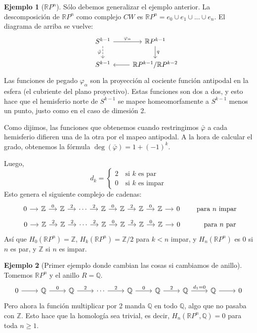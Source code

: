 \documentclass[spanish]{book}
\theoremstyle{definition}
\newtheorem*{ejem}{Ejemplo}
\newcommand{\R}{\mathbb{R}}
\newcommand{\Z}{\mathbb{Z}}
\newcommand{\Q}{\mathbb{Q}}
\begin{document}
	\begin{ejem}[$\R P^n$]
		Sólo debemos generalizar el ejemplo anterior. La descomposición de $\R P^n$ como complejo $CW$ es $\R P^n=e_0\cup e_1\cup...\cup e_n$. El diagrama de arriba se vuelve:
		\[\begin{tikzcd}
			& S^{k-1} \arrow[r, "\varphi_\alpha"] \arrow[d, dashed,swap, "\bar\varphi"] & \mathbb{R}P^{k-1} \arrow[d, "q"] \\
			& S^{k-1} & \mathbb{R}P^{k-1}/\mathbb{R}P^{k-2} \arrow[l]
		\end{tikzcd}\]
		Las funciones de pegado $\varphi_\alpha$ son la proyección al cociente función antipodal en la esfera (el cubriente del plano proyectivo). Estas funciones son dos a dos, y esto hace que el hemisferio norte de $S^{k-1}$ se mapee homeomorfamente a $S^{k-1}$ menos un punto, justo como en el caso de dimesión 2.
		
		Como dijimos, las funciones que obtenemos cuando restringimos $\bar\varphi$ a cada hemisferio difieren una de la otra por el mapeo antipodal. A la hora de calcular el grado, obtenemos la fórmula $\deg (\bar{\varphi})=1+(-1)^k$.
		
		Luego,
		\[d_k=\begin{cases}2\quad\text{si }k\text{ es par}\\0\quad\text{si }k\text{ es impar}\end{cases}\]
		Esto genera el siguiente complejo de cadenas:
		\[\begin{tikzcd}[column sep=small]
			0 \arrow[r] & \mathbb{Z} \arrow[r, "0"] & \mathbb{Z} \arrow[r, "2"] & \cdots \arrow[r, "2"] & \mathbb{Z} \arrow[r, "0"] & \mathbb{Z} \arrow[r, "2"] & \mathbb{Z} \arrow[r, "0"] & \mathbb{Z} \arrow[r] & 0
		\end{tikzcd}\qquad\text{para }n\text{ impar}\]
		\[\begin{tikzcd}[column sep=small]
			0 \arrow[r] & \mathbb{Z} \arrow[r, "2"] & \mathbb{Z} \arrow[r, "2"] & \cdots \arrow[r, "2"] & \mathbb{Z} \arrow[r, "0"] & \mathbb{Z} \arrow[r, "2"] & \mathbb{Z} \arrow[r, "0"] & \mathbb{Z} \arrow[r] & 0
		\end{tikzcd}\qquad\quad\text{para }n\text{ par}
		\]
		Así que $H_0(\R P^n)=\Z$, $H_k(\R P^n)=\Z/2$ para $k<n$ impar,  y $H_n(\R P^n)$ es $0$ si $n$ es par, y $\Z$ si $n$ es impar.
	\end{ejem}
	\begin{ejem}[Primer ejemplo donde cambian las cosas si cambiamos de anillo]
		Tomemos $\R P^n$ y el anillo $R=\Q$.
		\[\begin{tikzcd}
			0 \arrow[r] & \mathbb{Q} \arrow[r, "0"] & \mathbb{Q} \arrow[r, "2"] & \cdots \arrow[r, "2"] & \mathbb{Q} \arrow[r, "0"] & \mathbb{Q} \arrow[r, "2"] & \mathbb{Q} \arrow[r, "d_1=0"] & \mathbb{Q} \arrow[r] & 0
		\end{tikzcd}\]
		Pero ahora la función multiplicar por 2 manda $\Q$ en todo $\Q$, algo que no pasaba con $\Z$. Esto hace que la homología sea trivial, es decir, $H_n(\R P^n,\Q)=0$ para toda $n\geq1$.
	\end{ejem}
\end{document}
